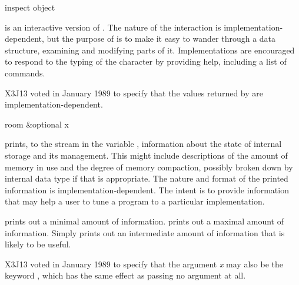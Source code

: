 \begin{defun}[Function]
inspect object

 is an interactive version of .
The nature of the interaction is implementation-dependent,
but the purpose of  is to make it easy to wander
through a data structure, examining and modifying parts of it.
Implementations are encouraged to respond to the typing
of the character  by providing help, including a list
of commands.

\begin{new}
X3J13 voted in January 1989
to specify that the values returned by 
are implementation-dependent.
\end{new}
\end{defun}

\begin{defun}[Function]
room &optional x

 prints, to the stream in the variable ,
information about the state of internal storage and its management.  This
might include descriptions of the amount of memory in use and the degree
of memory compaction, possibly broken down by internal data type if that
is appropriate.  The nature and format of the printed information is
implementation-dependent.  The intent is to provide information that may
help a user to tune a program to a particular implementation.

 prints out a minimal amount of information.
 prints out a maximal amount of information.
Simply  prints out an intermediate amount
of information that is likely to be useful.

\begin{new}
X3J13 voted in January 1989
to specify that the argument {\it x} may also be the keyword ,
which has the same effect as passing no argument at all.
\end{new}
\end{defun}


